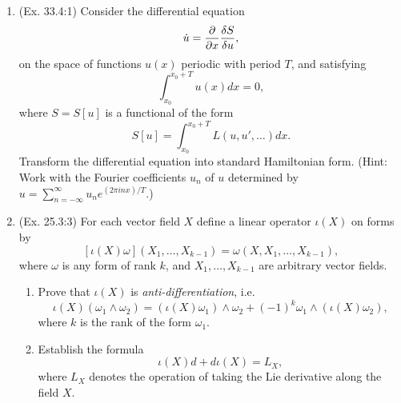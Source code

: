 \begin{enumerate}
\begin{proof}
\begin{enumerate}
			\item For $U(r) = \alpha r^2$, by a similar deduction, we can reduce the problem to the integral
			\begin{eqnarray}
				d\phi = \frac{-u du}{\sqrt{-u^4 + Au^2 -B}},
			\end{eqnarray}
			with $A = 2mE/|M|^2, B = 2m\alpha/|M|^2$. After a series of change of variable and substitution back, we then have
			\begin{eqnarray}
				\phi = \frac{1}{2} \arccos\left(\frac{2u^2 - A}{\sqrt{A^2 - 4B}}\right) + C
			\end{eqnarray}
			Set the boundary condition $\phi = \phi_0$ when $u^2 = (\sqrt{A^2 - 4B} + A)/2$, which leads to $C = \phi_0$. Therefore,
			\[ \phi - \phi_0 = \frac{1}{2} \arccos\left(\frac{2u^2/A - 1}{\sqrt{1 - 4B/A^2}}\right),\]
			or
			\begin{eqnarray}
				r^2 = \frac{|M|^2/mE}{1 + \sqrt{1 - |M|^2\alpha/2mE^2} \cos 2(\phi - \phi_0)}.
			\end{eqnarray}
			This as well represents a conic section in polar coordinate.  By the condition for an ellipse we can draw the same conclusion but in the region $E > 0, \alpha > 0$.
		\end{enumerate}
	\end{proof}
	
	\item (Ex. 33.4:1) Consider the differential equation \[ \dot{u} = \frac{ \partial  }{ \partial x } \frac{\delta S}{\delta u}, \] on the space of functions $u(x)$ periodic with period $T$, and satisfying \[ \int_{x_0}^{x_0+T} u(x) dx = 0, \] where $S = S[u]$ is a functional of the form \[ S[u] = \int_{x_0}^{x_0+T} L(u, u', \dots) dx. \] Transform the differential equation into standard Hamiltonian form. (Hint: Work with the Fourier coefficients $u_n$ of $u$ determined by $u = \sum_{n = -\infty}^{\infty} u_n e^{(2 \pi i n x)/T} $.)
	
	\item (Ex. 25.3:3) For each vector field $X$ define a linear operator $\iota(X)$ on forms by
	\[ [\iota(X)\omega](X_1, \dots, X_{k-1}) = \omega(X, X_1, \dots, X_{k-1}), \] where $\omega$ is any form of rank $k$, and $X_1, \dots, X_{k-1}$ are arbitrary vector fields.\label{thm:cartan_homo}
	\begin{enumerate}
		\item Prove that $\iota(X)$ is \emph{anti-differentiation}, i.e.
		\[ \iota(X)(\omega_1 \wedge \omega_2) = (\iota(X)\omega_1) \wedge \omega_2 + (-1)^k \omega_1 \wedge (\iota(X)\omega_2), \]
		where $k$ is the rank of the form $\omega_1$.
		\item Establish the formula \[ \iota(X)d + d \iota(X) = L_X, \] where $L_X$ denotes the operation of taking the Lie derivative along the field $X$.
	\end{enumerate}
\end{enumerate}


